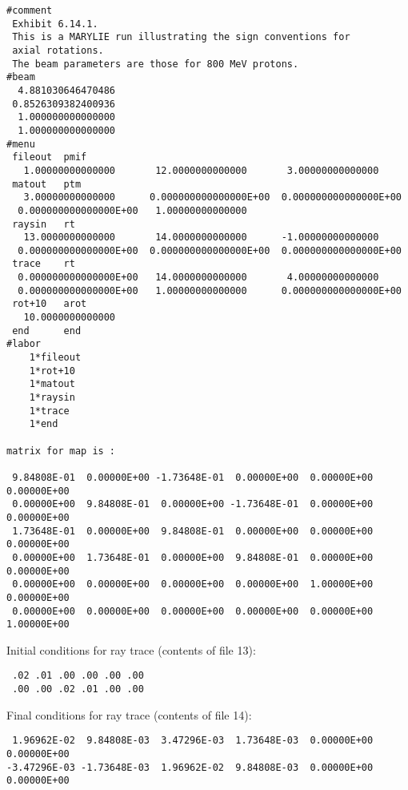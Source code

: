 \clearpage
\begin{footnotesize}
\begin{verbatim}
#comment
 Exhibit 6.14.1.
 This is a MARYLIE run illustrating the sign conventions for
 axial rotations.
 The beam parameters are those for 800 MeV protons.
#beam
  4.881030646470486
 0.8526309382400936
  1.000000000000000
  1.000000000000000
#menu
 fileout  pmif
   1.00000000000000       12.0000000000000       3.00000000000000
 matout   ptm
   3.00000000000000      0.000000000000000E+00  0.000000000000000E+00
  0.000000000000000E+00   1.00000000000000
 raysin   rt
   13.0000000000000       14.0000000000000      -1.00000000000000
  0.000000000000000E+00  0.000000000000000E+00  0.000000000000000E+00
 trace    rt
  0.000000000000000E+00   14.0000000000000       4.00000000000000
  0.000000000000000E+00   1.00000000000000      0.000000000000000E+00
 rot+10   arot
   10.0000000000000
 end      end
#labor
    1*fileout
    1*rot+10
    1*matout
    1*raysin
    1*trace
    1*end

matrix for map is :

 9.84808E-01  0.00000E+00 -1.73648E-01  0.00000E+00  0.00000E+00  0.00000E+00
 0.00000E+00  9.84808E-01  0.00000E+00 -1.73648E-01  0.00000E+00  0.00000E+00
 1.73648E-01  0.00000E+00  9.84808E-01  0.00000E+00  0.00000E+00  0.00000E+00
 0.00000E+00  1.73648E-01  0.00000E+00  9.84808E-01  0.00000E+00  0.00000E+00
 0.00000E+00  0.00000E+00  0.00000E+00  0.00000E+00  1.00000E+00  0.00000E+00
 0.00000E+00  0.00000E+00  0.00000E+00  0.00000E+00  0.00000E+00  1.00000E+00
\end{verbatim}
\end{footnotesize}
Initial conditions for ray trace (contents of file 13):
\begin{footnotesize}
\begin{verbatim}
 .02 .01 .00 .00 .00 .00
 .00 .00 .02 .01 .00 .00
\end{verbatim}
\end{footnotesize}
Final conditions for ray trace (contents of file 14):
\begin{footnotesize}
\begin{verbatim}
 1.96962E-02  9.84808E-03  3.47296E-03  1.73648E-03  0.00000E+00  0.00000E+00
-3.47296E-03 -1.73648E-03  1.96962E-02  9.84808E-03  0.00000E+00  0.00000E+00
\end{verbatim}
\end{footnotesize}


\newpage
